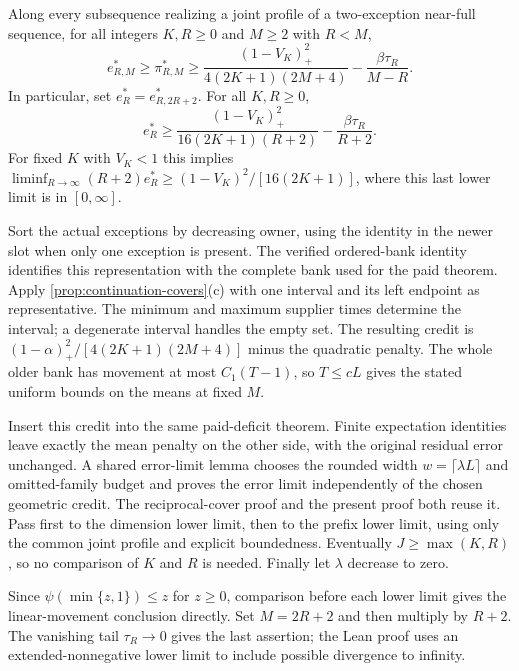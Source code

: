 \begin{corollary}\label{cor:necessary-exposure}
Along every subsequence realizing a joint profile of a two-exception
near-full sequence, for all integers $K,R\ge0$ and $M\ge2$ with $R<M$,
\[
 e^*_{R,M}\ge\pi^*_{R,M}\ge
 \frac{(1-V_K)_+^2}{4(2K+1)(2M+4)}-\frac{\beta\tau_R}{M-R}.
\]
In particular, set $e_R^*=e^*_{R,2R+2}$. For all $K,R\ge0$,
\begin{equation}\label{eq:necessary-exposure}
 e_R^*\ge
 \frac{(1-V_K)_+^2}{16(2K+1)(R+2)}-\frac{\beta\tau_R}{R+2}.
\end{equation}
For fixed $K$ with $V_K<1$ this implies
$\liminf_{R\to\infty}(R+2)e_R^*\ge(1-V_K)^2/[16(2K+1)]$,
where this last lower limit is in $[0,\infty]$.
\end{corollary}
\begin{outline}
Sort the actual exceptions by decreasing owner, using the identity in
the newer slot when only one exception is present. The verified
ordered-bank identity identifies this representation with the complete
bank used for the paid theorem. Apply
\cref{prop:continuation-covers}(c) with one interval and its left endpoint
as representative. The minimum and maximum supplier times determine
the interval; a degenerate interval handles the empty set. The resulting
credit is $(1-\alpha)_+^2/[4(2K+1)(2M+4)]$ minus the quadratic penalty.
The whole older bank has movement at most $C_1(T-1)$, so $T\le cL$
gives the stated uniform bounds on the means at fixed $M$.

Insert this credit into the same paid-deficit theorem. Finite expectation
identities leave exactly the mean penalty on the other side, with the
original residual error unchanged. A shared error-limit lemma chooses
the rounded width $w=\lceil\lambda L\rceil$ and omitted-family budget
and proves the error limit independently of the chosen geometric credit.
The reciprocal-cover proof and the present proof both reuse it.
Pass first to the dimension lower limit, then to the prefix lower limit,
using only the common joint profile and explicit boundedness. Eventually
$J\ge\max(K,R)$, so no comparison of $K$ and $R$ is needed. Finally let
$\lambda$ decrease to zero.

Since $\psi(\min\{z,1\})\le z$ for $z\ge0$, comparison before each
lower limit gives the linear-movement conclusion directly. Set $M=2R+2$
and then multiply by $R+2$. The vanishing tail $\tau_R\to0$ gives the
last assertion; the Lean proof uses an extended-nonnegative lower limit
to include possible divergence to infinity.
\end{outline}

